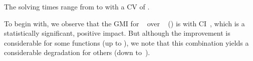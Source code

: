 %
The solving times range from
\printMinSolvingTime{
  \SolvTechEnableOnlyGoodPresolvingPrePlusSolvingTimeSpeedupNonePrePlusSolvingTimeAvgMin,
  \SolvTechEnableOnlyGoodPresolvingPrePlusSolvingTimeSpeedupPrePlusSolvingTimeAvgMin,
  \SolvTechDisableBadPresolvingPrePlusSolvingTimeSpeedupPrePlusSolvingTimeAvgMin,
  \SolvTechDisableAllPresolvingPrePlusSolvingTimeSpeedupPrePlusSolvingTimeAvgMin
} to
\printMaxSolvingTime{
  \SolvTechEnableOnlyGoodPresolvingPrePlusSolvingTimeSpeedupNonePrePlusSolvingTimeAvgMax,
  \SolvTechEnableOnlyGoodPresolvingPrePlusSolvingTimeSpeedupPrePlusSolvingTimeAvgMax,
  \SolvTechDisableBadPresolvingPrePlusSolvingTimeSpeedupPrePlusSolvingTimeAvgMax,
  \SolvTechDisableAllPresolvingPrePlusSolvingTimeSpeedupPrePlusSolvingTimeAvgMax
} with a \gls{CV} of
\numMaxOf{
  \SolvTechEnableOnlyGoodPresolvingPrePlusSolvingTimeSpeedupNonePrePlusSolvingTimeCvMax,
  \SolvTechEnableOnlyGoodPresolvingPrePlusSolvingTimeSpeedupPrePlusSolvingTimeCvMax,
  \SolvTechDisableBadPresolvingPrePlusSolvingTimeSpeedupPrePlusSolvingTimeCvMax,
  \SolvTechDisableAllPresolvingPrePlusSolvingTimeSpeedupPrePlusSolvingTimeCvMax
}.

To begin with, we observe that the \gls{GMI} for ~ over ~
() is \printGMI{%
  \SolvTechEnableOnlyGoodPresolvingPrePlusSolvingTimeSpeedupPrePlusSolvingTimeRegularSpeedupGmean%
} with \gls{CI}~\printGMICI{%
  \SolvTechEnableOnlyGoodPresolvingPrePlusSolvingTimeSpeedupPrePlusSolvingTimeRegularSpeedupCiMin%
}{%
  \SolvTechEnableOnlyGoodPresolvingPrePlusSolvingTimeSpeedupPrePlusSolvingTimeRegularSpeedupCiMax%
}, which is a statistically significant, positive impact.
%
But although the improvement is considerable for some \glspl{function} (up to
\printZCNorm{%
  \SolvTechEnableOnlyGoodPresolvingPrePlusSolvingTimeSpeedupPrePlusSolvingTimeZeroCenteredSpeedupMax%
}), we note that this combination yields a considerable degradation for others
(down
to~\printZCNorm{%
  \SolvTechEnableOnlyGoodPresolvingPrePlusSolvingTimeSpeedupPrePlusSolvingTimeZeroCenteredSpeedupMin%
}).

